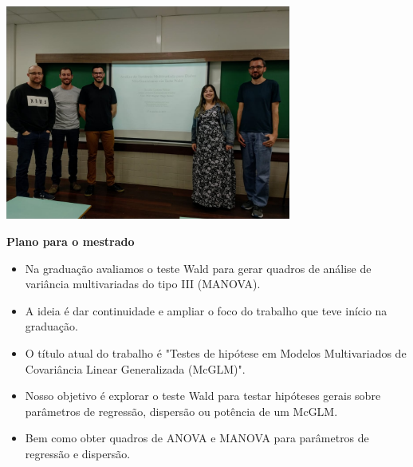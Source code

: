 \documentclass[10pt,
  aspectratio=169,
  serif,
  mathserif,
  professionalfont,
  compress,
  handout,
  ]{beamer}\usepackage[]{graphicx}\usepackage[]{color}
\begin{document}

\begin{frame}[c, allowframebreaks]

\begin{center}  
  \includegraphics[width=9.4cm]{img/tcc.jpg}  
\end{center}

\end{frame}

\begin{frame}[c, allowframebreaks]
  
  \textbf{Plano para o mestrado}
  
  \begin{itemize}
  
  \item Na graduação avaliamos o teste Wald para gerar quadros de análise de variância multivariadas do tipo III (MANOVA).
  
  \item A ideia é dar continuidade e ampliar o foco do trabalho que teve início na graduação.
  
  \item O título atual do trabalho é "Testes de hipótese em Modelos Multivariados de Covariância Linear Generalizada (McGLM)".

  \item Nosso objetivo é explorar o teste Wald para testar hipóteses gerais sobre parâmetros de regressão, dispersão ou potência de um McGLM.
  
  \item Bem como obter quadros de ANOVA e MANOVA para parâmetros de regressão e dispersão.

  \end{itemize}

\end{frame}
\end{document}
